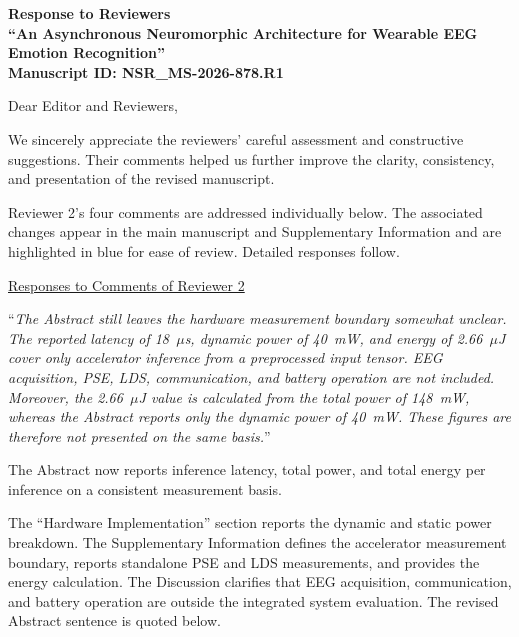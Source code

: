 \documentclass[12pt,technote,onecolumn]{IEEEtran}
\begin{document}
\begin{center}
{\large\bfseries Response to Reviewers}\\
{\bfseries ``An Asynchronous Neuromorphic Architecture for Wearable EEG Emotion Recognition''}\\
{\bfseries Manuscript ID: NSR\_MS-2026-878.R1}\\
\end{center}

\vspace{4mm}

Dear Editor and Reviewers,

We sincerely appreciate the reviewers' careful assessment and constructive suggestions. Their comments helped us further improve the clarity, consistency, and presentation of the revised manuscript.\par\medskip

Reviewer 2's four comments are addressed individually below. The associated changes appear in the main manuscript and Supplementary Information and are highlighted in blue for ease of review. Detailed responses follow.

\vspace{6mm}
\begin{center}
\underline{Responses to Comments of Reviewer 2}
\end{center}
\vspace{3mm}

\vspace{4mm}

``{\it The Abstract still leaves the hardware measurement boundary somewhat unclear. The reported latency of 18~$\mu$s, dynamic power of 40~mW, and energy of 2.66~$\mu$J cover only accelerator inference from a preprocessed input tensor. EEG acquisition, PSE, LDS, communication, and battery operation are not included. Moreover, the 2.66~$\mu$J value is calculated from the total power of 148~mW, whereas the Abstract reports only the dynamic power of 40~mW. These figures are therefore not presented on the same basis.}''
\vspace{1mm}

\par

The Abstract now reports inference latency, total power, and total energy per inference on a consistent measurement basis.

The ``Hardware Implementation'' section reports the dynamic and static power breakdown. The Supplementary Information defines the accelerator measurement boundary, reports standalone PSE and LDS measurements, and provides the energy calculation. The Discussion clarifies that EEG acquisition, communication, and battery operation are outside the integrated system evaluation. The revised Abstract sentence is quoted below.
\end{document}
